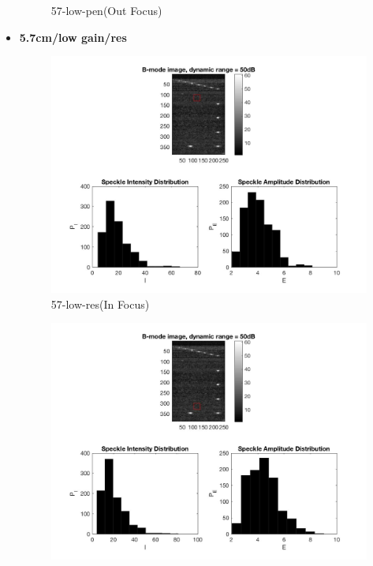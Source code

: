 \documentclass[12pts,a4paper]{article}
\begin{document}
\begin{itemize}
\begin{figure}[h]
    \caption{57-low-pen(Out Focus)}
    \label{fig:mesh1}
\end{figure}
\pagebreak
\item{\textbf{5.7cm/low gain/res}}
\begin{center}
\end{center}
\begin{figure}[h]
    \centering
    \includegraphics[width=1.0\textwidth]{img_hw2/57-low-res1.jpg}
    \caption{57-low-res(In Focus)}
    \label{fig:mesh1}
\end{figure}
\pagebreak
\begin{figure}[h]
    \centering
    \includegraphics[width=1.0\textwidth]{img_hw2/57-low-res2.jpg}

\end{figure}
\end{itemize}
\end{document}
